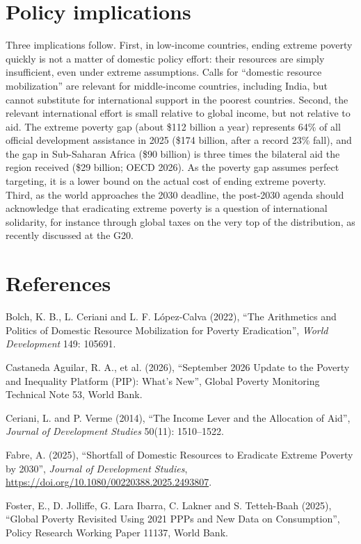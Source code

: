 \documentclass[11pt,english]{article}
\begin{document}
\section*{Policy implications}

Three implications follow. First, in low-income countries, ending extreme poverty quickly is not a matter of domestic policy effort: their resources are simply insufficient, even under extreme assumptions. Calls for ``domestic resource mobilization'' are relevant for middle-income countries, including India, but cannot substitute for international support in the poorest countries. Second, the relevant international effort is small relative to global income, but not relative to aid. The extreme poverty gap (about \$112 billion a year) represents 64\% of all official development assistance in 2025 (\$174 billion, after a record 23\% fall), and the gap in Sub-Saharan Africa (\$90 billion) is three times the bilateral aid the region received (\$29 billion; OECD 2026). As the poverty gap assumes perfect targeting, it is a lower bound on the actual cost of ending extreme poverty. Third, as the world approaches the 2030 deadline, the post-2030 agenda should acknowledge that eradicating extreme poverty is a question of international solidarity, for instance through global taxes on the very top of the distribution, as recently discussed at the G20.

\section*{References}
\begingroup\small\setlength{\parindent}{0pt}\setlength{\parskip}{0.5em}

Bolch, K. B., L. Ceriani and L. F. López-Calva (2022), ``The Arithmetics and Politics of Domestic Resource Mobilization for Poverty Eradication'', \emph{World Development} 149: 105691.

Castaneda Aguilar, R. A., et al. (2026), ``September 2026 Update to the Poverty and Inequality Platform (PIP): What's New'', Global Poverty Monitoring Technical Note 53, World Bank.

Ceriani, L. and P. Verme (2014), ``The Income Lever and the Allocation of Aid'', \emph{Journal of Development Studies} 50(11): 1510--1522.

Fabre, A. (2025), ``Shortfall of Domestic Resources to Eradicate Extreme Poverty by 2030'', \emph{Journal of Development Studies}, \url{https://doi.org/10.1080/00220388.2025.2493807}.

Foster, E., D. Jolliffe, G. Lara Ibarra, C. Lakner and S. Tetteh-Baah (2025), ``Global Poverty Revisited Using 2021 PPPs and New Data on Consumption'', Policy Research Working Paper 11137, World Bank.
\end{document}
